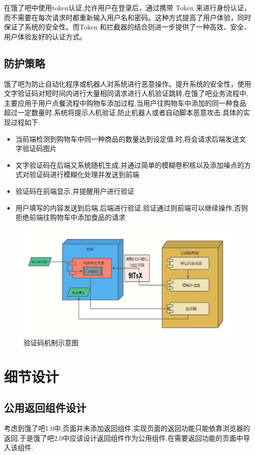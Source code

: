 在饿了吧中使用token认证,允许用户在登录后，通过携带 Token 来进行身份认证，而不需要在每次请求时都重新输入用户名和密码。这种方式提高了用户体验，同时保证了系统的安全性。而Token 和拦截器的结合则进一步提供了一种高效、安全、用户体验友好的认证方式。

\subsection{防护策略}\label{con:rjyz}
饿了吧为防止自动化程序或机器人对系统进行恶意操作。提升系统的安全性，使用文字验证码对短时间内进行大量相同请求进行人机验证跳转,在饿了吧业务流程中,主要应用于用户点餐流程中购物车添加过程,当用户往购物车中添加的同一种食品超过一定数量时,系统将提示人机验证,防止机器人或者自动脚本恶意攻击.具体的实现过程如下:

\begin{itemize}
    \item 当前端检测到购物车中同一种商品的数量达到设定值,时,将会请求后端发送文字验证码图片
    \item 文字验证码在后端又系统随机生成,并通过简单的模糊卷积核以及添加噪点的方式对验证码进行模糊化处理并发送到前端
    \item 验证码在前端显示,并提醒用户进行验证
    \item 用户填写的内容发送到后端,后端进行验证,验证通过则前端可以继续操作,否则拒绝前端往购物车中添加食品的请求
\end{itemize}
\begin{figure}[h]
    \centering
    \includegraphics[width=1\linewidth]{pics/人机验证.png}
    \caption{验证码机制示意图}
\end{figure}


\section{细节设计}
\subsection{公用返回组件设计}
考虑到饿了吧1.0中,页面并未添加返回组件,实现页面的返回功能只能依靠浏览器的返回,于是饿了吧2.0中应该设计返回组件作为公用组件,在需要返回功能的页面中导入该组件.


